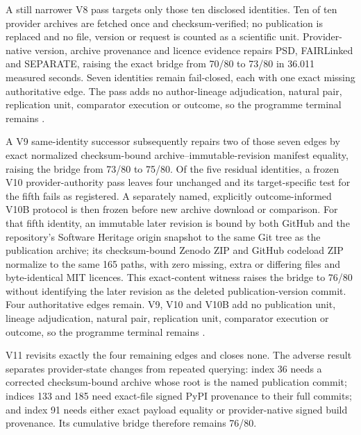 A still narrower V8 pass targets only those ten disclosed identities. Ten of
ten provider archives are fetched once and checksum-verified; no publication
is replaced and no file, version or request is counted as a scientific unit.
Provider-native version, archive provenance and licence evidence repairs PSD,
FAIRLinked and SEPARATE, raising the exact bridge from 70/80 to 73/80 in
36.011 measured seconds. Seven identities remain fail-closed, each with one
exact missing authoritative edge. The pass adds no author-lineage
adjudication, natural pair, replication unit, comparator execution or outcome,
so the programme terminal remains
.

A V9 same-identity successor subsequently repairs two of those seven edges by
exact normalized checksum-bound archive--immutable-revision manifest equality,
raising the bridge from 73/80 to 75/80.  Of the five residual identities, a
frozen V10 provider-authority pass leaves four unchanged and its target-specific
test for the fifth fails as registered.  A separately named, explicitly
outcome-informed V10B protocol is then frozen before new archive download or
comparison.  For that fifth identity, an immutable later revision is bound by
both GitHub and the repository's Software Heritage origin snapshot to the same
Git tree as the publication archive; its checksum-bound Zenodo ZIP and GitHub
codeload ZIP normalize to the same 165 paths, with zero missing, extra or
differing files and byte-identical MIT licences.  This exact-content witness
raises the bridge to 76/80 without identifying the later revision as the
deleted publication-version commit.  Four authoritative edges remain.  V9,
V10 and V10B add no publication unit, lineage adjudication, natural pair,
replication unit, comparator execution or outcome, so the programme terminal
remains .

V11 revisits exactly the four remaining edges and closes none.  The adverse
result separates provider-state changes from repeated querying: index 36 needs
a corrected checksum-bound archive whose root is the named publication commit;
indices 133 and 185 need exact-file signed PyPI provenance to their full
commits; and index 91 needs either exact payload equality or provider-native
signed build provenance.  Its cumulative bridge therefore remains 76/80.


